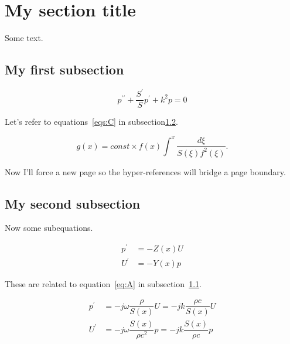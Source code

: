 \documentclass[reqno]{amsart}
\numberwithin{equation}{subsection}
\begin{document}
\section{My section title}

Some text.

\subsection{My first subsection}
\label{ss:first}

\begin{equation}
\label{eq:A}
p^{\prime\prime} + \dfrac{S^\prime}{S}p^\prime +k^2p = 0
\end{equation}

Let's refer to equations~\ref{eqs:C} in
subsection\ref{ss:second}.

\begin{equation}
\label{eq:B}
g(x)=const \times f(x) \int^{x} \dfrac{d\xi}{S(\xi)f^{2}(\xi)} .
\end{equation}

Now I'll force a new page so the hyper-references will bridge a page
boundary.
\newpage

\subsection{My second subsection}
\label{ss:second}
Now some subequations.

\begin{subequations}
\label{eqs:C}
\begin{align}
p^\prime& = -Z(x)U \label{eq:pC} \\
U^\prime & = -Y(x)p \label{eq:UC}
\end{align}
\end{subequations}

These are related to equation~\ref{eq:A} in subsection~\ref{ss:first}.

{%
\begin{subequations}
\label{eqs:D}
\begin{align}
p^\prime& = -j \omega {\dfrac{\rho}{S(x)}}U
 = -jk {\dfrac{\rho c}{S(x)}}U \label{eq:pD} \\
U^\prime & = -j \omega {\dfrac{S(x)}{\rho c^{2}}}p
 = -jk {\dfrac{S(x)}{\rho c}}p \label{eq:UD}
\end{align}
\end{subequations}
}
\end{document}
